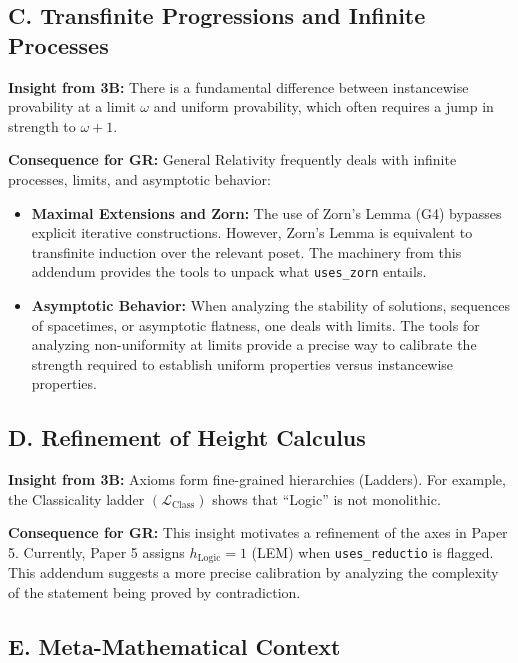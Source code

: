 \documentclass[11pt]{article}
\begin{document}
\subsection{C. Transfinite Progressions and Infinite Processes}

\textbf{Insight from 3B:} There is a fundamental difference between instancewise provability at a limit $\omega$ and uniform provability, which often requires a jump in strength to $\omega+1$.

\textbf{Consequence for GR:} General Relativity frequently deals with infinite processes, limits, and asymptotic behavior:

\begin{itemize}
\item \textbf{Maximal Extensions and Zorn:} The use of Zorn's Lemma (G4) bypasses explicit iterative constructions. However, Zorn's Lemma is equivalent to transfinite induction over the relevant poset. The machinery from this addendum provides the tools to unpack what \texttt{uses\_zorn} entails.

\item \textbf{Asymptotic Behavior:} When analyzing the stability of solutions, sequences of spacetimes, or asymptotic flatness, one deals with limits. The tools for analyzing non-uniformity at limits provide a precise way to calibrate the strength required to establish uniform properties versus instancewise properties.
\end{itemize}

\subsection{D. Refinement of Height Calculus}

\textbf{Insight from 3B:} Axioms form fine-grained hierarchies (Ladders). For example, the Classicality ladder $(\mathcal{L}_{\mathrm{Class}})$ shows that ``Logic'' is not monolithic.

\textbf{Consequence for GR:} This insight motivates a refinement of the axes in Paper 5. Currently, Paper 5 assigns $h_{\mathrm{Logic}}=1$ (LEM) when \texttt{uses\_reductio} is flagged. This addendum suggests a more precise calibration by analyzing the complexity of the statement being proved by contradiction.

\subsection{E. Meta-Mathematical Context}
\end{document}

